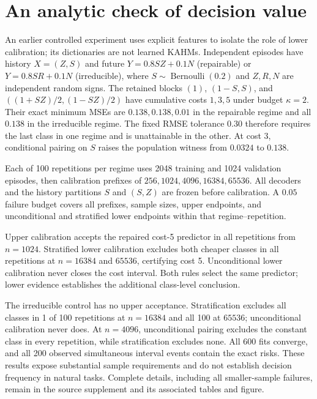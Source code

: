 \section{An analytic check of decision value}
\label{sec:decision-value}

An earlier controlled experiment uses explicit features to isolate the role
of lower calibration; its dictionaries are not learned KAHMs. Independent
episodes have history $X=(Z,S)$ and future
$Y=0.8SZ+0.1N$ (repairable) or $Y=0.8SR+0.1N$ (irreducible), where
$S\sim\operatorname{Bernoulli}(0.2)$ and $Z,R,N$ are independent random
signs. The retained blocks $(1)$, $(1-S,S)$, and
$((1+SZ)/2,(1-SZ)/2)$ have cumulative costs $1,3,5$ under budget
$\kappa=2$. Their exact minimum MSEs are $0.138,0.138,0.01$ in the
repairable regime and all $0.138$ in the irreducible regime. The fixed RMSE
tolerance $0.30$ therefore requires the last class in one regime and is
unattainable in the other. At cost 3, conditional pairing on $S$ raises
the population witness from $0.0324$ to $0.138$.

Each of 100 repetitions per regime uses 2048 training and 1024 validation
episodes, then calibration prefixes of $256,1024,4096,16384,65536$.
All decoders and the history partitions $S$ and $(S,Z)$ are frozen before
calibration. A $0.05$ failure budget covers all prefixes, sample sizes,
upper endpoints, and unconditional and stratified lower endpoints within
that regime--repetition.

Upper calibration accepts the repaired cost-5 predictor in all repetitions
from $n=1024$. Stratified lower calibration excludes both cheaper classes
in all repetitions at $n=16384$ and $65536$, certifying cost 5.
Unconditional lower calibration never closes the cost interval. Both rules
select the same predictor; lower evidence establishes the additional
class-level conclusion.

The irreducible control has no upper acceptance. Stratification excludes all
classes in 1 of 100 repetitions at $n=16384$ and all 100 at $65536$;
unconditional calibration never does. At $n=4096$, unconditional pairing
excludes the constant class in every repetition, while stratification excludes
none. All 600 fits converge, and all 200 observed simultaneous interval events
contain the exact risks. These results expose substantial sample requirements
and do not establish decision frequency in natural tasks. Complete details,
including all smaller-sample failures, remain in the source supplement
 and its associated tables
and figure.
